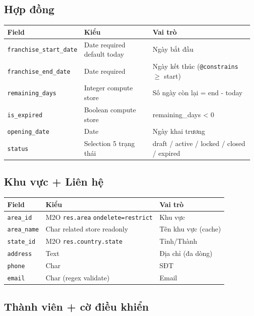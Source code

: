 \subsection{Hợp đồng}

\begin{longtable}{p{5cm} p{4cm} p{6cm}}
\toprule
\textbf{Field} & \textbf{Kiểu} & \textbf{Vai trò} \\
\midrule
\endhead
\texttt{franchise\_start\_date} & Date required default today & Ngày bắt đầu \\
\texttt{franchise\_end\_date} & Date required & Ngày kết thúc (\texttt{@constrains} $\geq$ start) \\
\texttt{remaining\_days} & Integer compute store & Số ngày còn lại = end - today \\
\texttt{is\_expired} & Boolean compute store & remaining\_days < 0 \\
\texttt{opening\_date} & Date & Ngày khai trương \\
\texttt{status} & Selection 5 trạng thái & draft / active / locked / closed / expired \\
\bottomrule
\end{longtable}

\subsection{Khu vực + Liên hệ}

\begin{longtable}{p{5cm} p{4cm} p{6cm}}
\toprule
\textbf{Field} & \textbf{Kiểu} & \textbf{Vai trò} \\
\midrule
\endhead
\texttt{area\_id} & M2O \texttt{res.area} \texttt{ondelete=restrict} & Khu vực \\
\texttt{area\_name} & Char related store readonly & Tên khu vực (cache) \\
\texttt{state\_id} & M2O \texttt{res.country.state} & Tỉnh/Thành \\
\texttt{address} & Text & Địa chỉ (đa dòng) \\
\texttt{phone} & Char & SĐT \\
\texttt{email} & Char (regex validate) & Email \\
\bottomrule
\end{longtable}

\subsection{Thành viên + cờ điều khiển}

